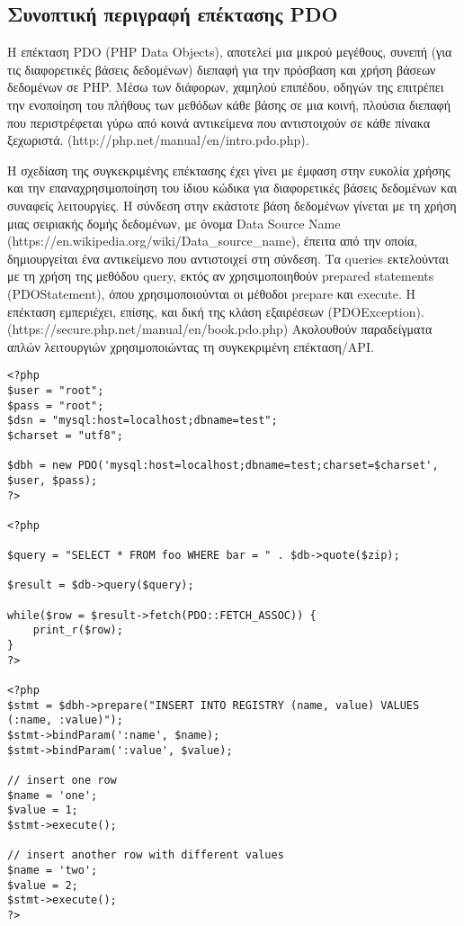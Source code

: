 \documentclass[diploma]{softlab-thesis}
\begin{document}
\subsection{Συνοπτική περιγραφή επέκτασης PDO}

Η επέκταση PDO (PHP Data Objects), αποτελεί μια μικρού μεγέθους, συνεπή (για
τις διαφορετικές βάσεις δεδομένων) διεπαφή για την πρόσβαση και χρήση βάσεων
δεδομένων σε PHP. Μέσω των διάφορων, χαμηλού επιπέδου, οδηγών της επιτρέπει την
ενοποίηση του πλήθους των μεθόδων κάθε βάσης σε μια κοινή, πλούσια διεπαφή που
περιστρέφεται γύρω από κοινά αντικείμενα που αντιστοιχούν σε κάθε πίνακα ξεχωριστά.
(http://php.net/manual/en/intro.pdo.php).

\bigskip

Η σχεδίαση της συγκεκριμένης επέκτασης έχει γίνει με έμφαση στην ευκολία χρήσης
και την επαναχρησιμοποίηση του ίδιου κώδικα για διαφορετικές βάσεις δεδομένων
και συναφείς λειτουργίες. Η σύνδεση στην εκάστοτε βάση δεδομένων γίνεται με τη
χρήση μιας σειριακής δομής δεδομένων, με όνομα Data Source Name
(https://en.wikipedia.org/wiki/Data\_source\_name), έπειτα από την οποία,
δημιουργείται ένα αντικείμενο που αντιστοιχεί στη σύνδεση. Τα queries
εκτελούνται με τη χρήση της μεθόδου query, εκτός αν χρησιμοποιηθούν prepared
statements (PDOStatement), όπου χρησιμοποιούνται οι μέθοδοι prepare και
execute. Η επέκταση εμπεριέχει, επίσης, και δική της κλάση εξαιρέσεων
(PDOException). (https://secure.php.net/manual/en/book.pdo.php) Ακολουθούν
παραδείγματα απλών λειτουργιών χρησιμοποιώντας τη συγκεκριμένη επέκταση/API.


\begin{lstlisting}
<?php
$user = "root";
$pass = "root";
$dsn = "mysql:host=localhost;dbname=test";
$charset = "utf8";

$dbh = new PDO('mysql:host=localhost;dbname=test;charset=$charset', $user, $pass);
?>

<?php

$query = "SELECT * FROM foo WHERE bar = " . $db->quote($zip);

$result = $db->query($query);

while($row = $result->fetch(PDO::FETCH_ASSOC)) {
    print_r($row);
}
?>

<?php
$stmt = $dbh->prepare("INSERT INTO REGISTRY (name, value) VALUES (:name, :value)");
$stmt->bindParam(':name', $name);
$stmt->bindParam(':value', $value);

// insert one row
$name = 'one';
$value = 1;
$stmt->execute();

// insert another row with different values
$name = 'two';
$value = 2;
$stmt->execute();
?>
\end{lstlisting}
\end{document}
